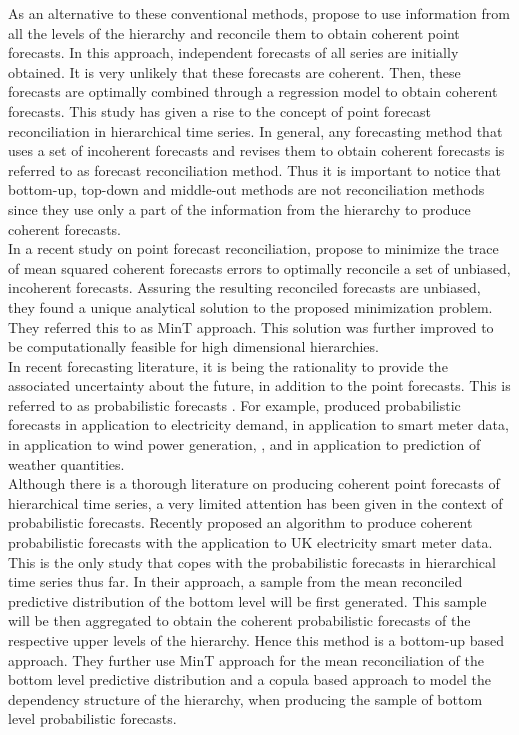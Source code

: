 \documentclass[a4paper, 11pt]{article}
\begin{document}
\noindent
As an alternative to these conventional methods, \citet{Hyndman2011} propose to use information from all the levels of the hierarchy and reconcile them to obtain coherent point forecasts. In this approach, independent forecasts of all series are initially obtained. It is very unlikely that these forecasts are coherent. Then, these forecasts are optimally combined through a regression model to obtain coherent forecasts. This study has given a rise to the concept of point forecast reconciliation in hierarchical time series. In general, any forecasting method that uses a set of incoherent forecasts and revises them to obtain coherent forecasts is referred to as forecast reconciliation method. Thus it is important to notice that bottom-up, top-down and middle-out methods are not reconciliation methods since they use only a part of the information from the hierarchy to produce coherent forecasts. \\ 

\noindent
In a recent study on point forecast reconciliation, \citet{Wickramasuriya2017} propose to minimize the trace of mean squared coherent forecasts errors to optimally reconcile a set of unbiased, incoherent forecasts. Assuring the resulting reconciled forecasts are unbiased, they found a unique analytical solution to the proposed minimization problem. They referred this to as MinT approach. This solution was further improved to be computationally feasible for high dimensional hierarchies. \\

\noindent
In recent forecasting literature, it is being the rationality to provide the associated uncertainty about the future, in addition to the point forecasts. This is referred to as probabilistic forecasts \citep{Gneiting2014}. For example, \citet{McSharry2005} produced probabilistic forecasts in application to electricity demand, \citet{BenTaieb2017} in application to smart meter data, \citet{Pinson2009} in application to wind power generation, \citet{Gel2004}, \citet{Gneiting2005a} and \citet{Gneiting2005} in application to prediction of weather quantities. \\

\noindent      
Although there is a thorough literature on producing coherent point forecasts of hierarchical time series, a very limited attention has been given in the context of probabilistic forecasts. Recently \citet{BenTaieb2017} proposed an algorithm to produce coherent probabilistic forecasts with the application to UK electricity smart meter data. This is the only study that copes with the probabilistic forecasts in hierarchical time series thus far. In their approach, a sample from the mean reconciled predictive distribution of the bottom level will be first generated. This sample will be then aggregated to obtain the coherent probabilistic forecasts of the respective upper levels of the hierarchy. Hence this method is a bottom-up based approach. They further use MinT approach for the mean reconciliation of the bottom level predictive distribution and a copula based approach to model the dependency structure of the hierarchy, when producing the sample of bottom level probabilistic forecasts.\\
\end{document}
